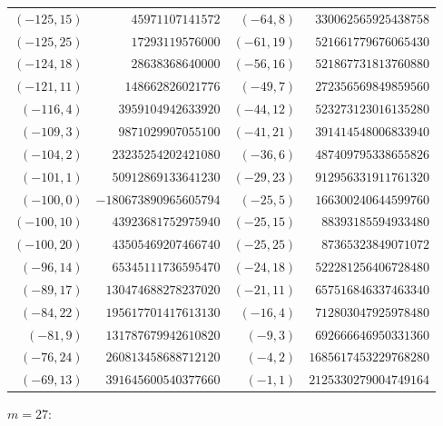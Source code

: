 {\scriptsize\begin{tabular}{@{}r@{\ \ }r@{\qquad}r@{\ \ }r@{}}
$(-125,15)$ & $45971107141572$ & $(-64,8)$ & $330062565925438758$ \\
$(-125,25)$ & $17293119576000$ & $(-61,19)$ & $521661779676065430$ \\
$(-124,18)$ & $28638368640000$ & $(-56,16)$ & $521867731813760880$ \\
$(-121,11)$ & $148662826021776$ & $(-49,7)$ & $272356569849859560$ \\
$(-116,4)$ & $3959104942633920$ & $(-44,12)$ & $523273123016135280$ \\
$(-109,3)$ & $9871029907055100$ & $(-41,21)$ & $391414548006833940$ \\
$(-104,2)$ & $23235254202421080$ & $(-36,6)$ & $487409795338655826$ \\
$(-101,1)$ & $50912869133641230$ & $(-29,23)$ & $912956331911761320$ \\
$(-100,0)$ & $-180673890965605794$ & $(-25,5)$ & $166300240644599760$ \\
$(-100,10)$ & $43923681752975940$ & $(-25,15)$ & $88393185594933480$ \\
$(-100,20)$ & $43505469207466740$ & $(-25,25)$ & $87365323849071072$ \\
$(-96,14)$ & $65345111736595470$ & $(-24,18)$ & $522281256406728480$ \\
$(-89,17)$ & $130474688278237020$ & $(-21,11)$ & $657516846337463340$ \\
$(-84,22)$ & $195617701417613130$ & $(-16,4)$ & $712803047925978480$ \\
$(-81,9)$ & $131787679942610820$ & $(-9,3)$ & $692666646950331360$ \\
$(-76,24)$ & $260813458688712120$ & $(-4,2)$ & $1685617453229768280$ \\
$(-69,13)$ & $391645600540377660$ & $(-1,1)$ & $2125330279004749164$ \\
\end{tabular}}\par\medskip
\noindent$m=27$:\nopagebreak\\[2pt]
